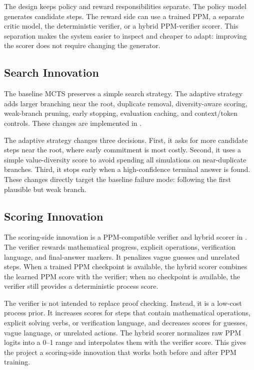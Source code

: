 \documentclass[sigconf,nonacm]{acmart}
\begin{document}
The design keeps policy and reward responsibilities separate. The policy model
generates candidate steps. The reward side can use a trained PPM, a separate
critic model, the deterministic verifier, or a hybrid PPM-verifier scorer. This
separation makes the system easier to inspect and cheaper to adapt: improving
the scorer does not require changing the generator.

\subsection{Search Innovation}

The baseline MCTS preserves a simple search strategy. The adaptive strategy adds
larger branching near the root, duplicate removal, diversity-aware scoring,
weak-branch pruning, early stopping, evaluation caching, and context/token
controls. These changes are implemented in .

The adaptive strategy changes three decisions. First, it asks for more
candidate steps near the root, where early commitment is most costly. Second, it
uses a simple value-diversity score to avoid spending all simulations on
near-duplicate branches. Third, it stops early when a high-confidence terminal
answer is found. These changes directly target the baseline failure mode:
following the first plausible but weak branch.

\subsection{Scoring Innovation}

The scoring-side innovation is a PPM-compatible verifier and hybrid scorer in
. The verifier rewards mathematical progress,
explicit operations, verification language, and final-answer markers. It
penalizes vague guesses and unrelated steps. When a trained PPM checkpoint is
available, the hybrid scorer combines the learned PPM score with the verifier;
when no checkpoint is available, the verifier still provides a deterministic
process score.

The verifier is not intended to replace proof checking. Instead, it is a
low-cost process prior. It increases scores for steps that contain mathematical
operations, explicit solving verbs, or verification language, and decreases
scores for guesses, vague language, or unrelated actions. The hybrid scorer
normalizes raw PPM logits into a 0--1 range and interpolates them with the
verifier score. This gives the project a scoring-side innovation that works both
before and after PPM training.
\end{document}
